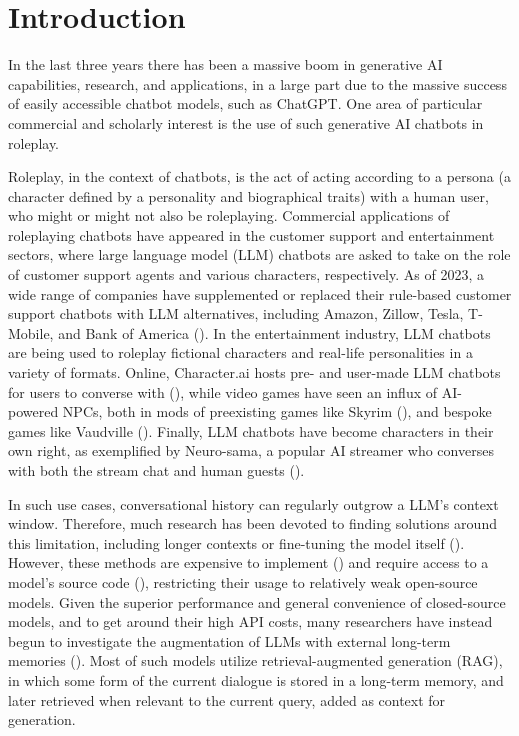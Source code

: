 \section{Introduction}


In the last three years there has been a massive boom in generative AI capabilities, research, and applications, in a large part due to the massive success of easily accessible chatbot models, such as ChatGPT. One area of particular commercial and scholarly interest is the use of such generative AI chatbots in roleplay.

	Roleplay, in the context of chatbots, is the act of acting according to a persona (a character defined by a personality and biographical traits) with a human user, who might or might not also be roleplaying. Commercial applications of roleplaying chatbots have appeared in the customer support and entertainment sectors, where large language model (LLM) chatbots are asked to take on the role of customer support agents and various characters, respectively. As of 2023, a wide range of companies have supplemented or replaced their rule-based customer support chatbots with LLM alternatives, including Amazon, Zillow, Tesla, T-Mobile, and Bank of America (\cite{SiteGPT}). In the entertainment industry, LLM chatbots are being used to roleplay fictional characters and real-life personalities in a variety of formats. Online, Character.ai hosts pre- and user-made LLM chatbots for users to converse with (\cite{Character_ai}), while video games have seen an influx of AI-powered NPCs, both in mods of preexisting games like Skyrim (\cite{art-from-the-machine}), and bespoke games like Vaudville (\cite{Vaudville}). Finally, LLM chatbots have become characters in their own right, as exemplified by Neuro-sama, a popular AI streamer who converses with both the stream chat and human guests (\cite{Neuro_sama}).
	
	In such use cases, conversational history can regularly outgrow a LLM's context window. Therefore, much research has been devoted to finding solutions around this limitation, including longer contexts or fine-tuning the model itself (\cite{Fatehkia2024}). However, these methods are expensive to implement (\cite{Fatehkia2024}) and require access to a model's source code (\cite{Wang2024}), restricting their usage to relatively weak open-source models. Given the superior performance and general convenience of closed-source models, and to get around their high API costs, many researchers have instead begun to investigate the augmentation of LLMs with external long-term memories (\cite{Wang2024}). Most of such models utilize retrieval-augmented generation (RAG), in which some form of the current dialogue is stored in a long-term memory, and later retrieved when relevant to the current query, added as context for generation. 
	
